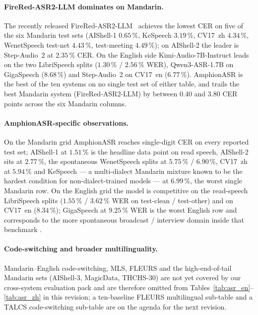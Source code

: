\paragraph{FireRed-ASR2-LLM dominates on Mandarin.}
The recently released FireRed-ASR2-LLM~\cite{fireredasr2025}
achieves the lowest CER on five of the six Mandarin test sets
(AIShell-1 $0.65$\,\%, KeSpeech $3.19$\,\%, CV17~zh $4.34$\,\%,
WenetSpeech test-net $4.43$\,\%, test-meeting $4.49$\,\%); on
AIShell-2 the leader is Step-Audio~2 at $2.35$\,\% CER. On the
English side Kimi-Audio-7B-Instruct leads on the two LibriSpeech
splits ($1.30$\,\% / $2.56$\,\% WER), Qwen3-ASR-1.7B on GigaSpeech
($8.68$\,\%) and Step-Audio~2 on CV17~en ($6.77$\,\%). AmphionASR
is the best of the ten systems on no single test set of either
table, and trails the best Mandarin system (FireRed-ASR2-LLM) by
between $0.40$ and $3.80$ CER points across the six Mandarin
columns.

\paragraph{AmphionASR-specific observations.}
On the Mandarin grid AmphionASR reaches single-digit CER on every
reported test set; AIShell-1 at $1.51$\,\% is the headline data
point on read speech, AIShell-2 sits at $2.77$\,\%, the
spontaneous WenetSpeech splits at $5.75$\,\% / $6.90$\,\%, CV17~zh
at $5.94$\,\% and KeSpeech --- a multi-dialect Mandarin mixture
known to be the hardest condition for non-dialect-trained models
\cite{tang2021kespeech} --- at $6.99$\,\%, the worst single
Mandarin row. On the English grid the model is competitive on the
read-speech LibriSpeech splits ($1.55$\,\% / $3.62$\,\% WER on
test-clean / test-other) and on CV17~en ($8.34$\,\%); GigaSpeech
at $9.25$\,\% WER is the worst English row and corresponds to the
more spontaneous broadcast / interview domain inside that
benchmark \cite{chen2021gigaspeech}.

\paragraph{Code-switching and broader multilinguality.}
Mandarin--English code-switching, MLS, FLEURS and the
high-end-of-tail Mandarin sets (AIShell-3, MagicData, THCHS-30)
are not yet covered by our cross-system evaluation pack and are
therefore omitted from
Tables~\ref{tab:asr_en}--\ref{tab:asr_zh} in this revision; a
ten-baseline FLEURS multilingual sub-table and a TALCS
\cite{li2022talcs} code-switching sub-table are on the agenda for
the next revision.
